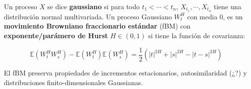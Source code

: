 \begin{boxDef}
	Un proceso $X$ se dice \textbf{gaussiano} si para todo $t_1 < \cdots < t_n$, $X_{t_1}, \cdots, X_{t_n}$ tiene una distribución normal multivariada. Un proceso Gaussiano $W_t^H$ con media $0$, es un \textbf{movimiento Browniano fraccionario estándar} (fBM) con \textbf{exponente/parámero de Hurst} $H \in (0,1)$ si tiene la función de covarianza:

	\[
		\mathbb{E}( W_t^H W_s^H ) - \mathbb{E}(W_t^H) \mathbb{E}(W_s^H) = \frac{1}{2} (  \lvert t \rvert^{2H} + \lvert s \rvert^{2H} - \lvert t - s \rvert^{2H} )
	\]
\end{boxDef}


El fBM preserva propiedades de incrementos estacionarios, autosimilaridad (¿?) y distribuciones finito-dimensionales Gaussianas.

